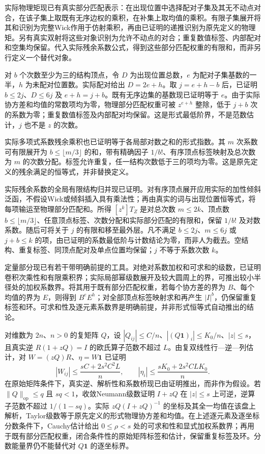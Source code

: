 \documentclass[UTF8,11pt,fontset=fandol]{ctexart}
\begin{document}
实际物理矩现已有真实部分匹配表示：在出现位置中选择配对子集及其无不动点对合，在该子集上取既有无序边权的乘积，在补集上取均值的乘积。有限子集展开将其和识别为完整Wick作用于仿射乘积，再由已证明的递推识别为原先定义的物理矩。另有真实双射将这些对象识别为允许不动点的对合；重复数值标签、内部配对和空集均保留。代入实际残余系数公式，得到这些部分匹配权重的有限和，而非另行定义一个替代对象。

对 $b$ 个次数至少为三的结构顶点，令 $D$ 为出现位置总数，$e$ 为配对子集基数的一半，$h$ 为未配对位置数。实际配对给出 $D=2e+h$。取 $j=e+h-b$ 后，已证明 $b\le2j$、$D\le6j$ 及 $e+h=j+b$。既有无序边集的基数现已证明等于 $e$。由于实际协方差和均值的常数项均为零，物理部分匹配权重可被 $z^{e+h}$ 整除，低于 $j+b$ 次的系数为零；重复数值标签及内部配对均保留。这是形式最低阶界，不是范数估计，$j$ 也不是 $z$ 的次数。

实际多项式系数残余乘积也已证明等于各局部对数之和的形式指数。其 $m$ 次系数可有限展开为 $b\le\lfloor m/3\rfloor$ 的和，带有精确因子 $1/b!$、有序顶点标签映射及总次数为 $m$ 的次数分配。标签允许重复，任一结构次数低于三的项均为零。这是原先定义的残余满足的恒等式，并非替换定义。

实际残余系数的全局有限结构归并现已证明。对有序顶点展开应用实际的加性倾斜泛函，不假设Wick或倾斜插入具有乘法性；再由真实的词与出现位置恒等式，将每项输运至物理部分匹配和。所得 $[z^k]T_Z$ 是对总次数 $m\le2k$、顶点数 $b\le\lfloor m/3\rfloor$、任意顶点标签、次数分配和实际部分匹配的有限和，保留 $1/b!$ 及对数系数。随后可将关于 $j$ 的有限和移至最外层。凡不满足 $b\le2j$、$m\le6j$ 或 $j+b\le k$ 的项，由已证明的系数最低阶与计数结论为零，而非人为截去。空结构、重复标签、同顶点配对及单点位置均保留；$j$ 不等于系数次数 $k$。

定量部分现已有若干带明确前提的工具。对绝对系数加权和可求和的级数，已证明卷积次乘性和有限乘积界；实际局部幂级数展开及较大圆周上的界，可推出较小半径处的加权系数界。将其用于既有部分匹配权重，若每个协方差的界为 $B$、每个均值的界为 $E$，则得到 $B^eE^h$；对全部顶点标签映射求和再产生 $|I|^b$，仍保留重复标签和环。可求和性及逐元素系数界是明确前提，并非形式恒等式自动推出的结论。

对维数为 $2n$、$n>0$ 的复矩阵 $Q$，设 $|Q_{ij}|\le C/n$、$|(Q\mathbf1)_i|\le K_0/n$、$|z|\le s$，且真实逆 $R(1+zQ)=I$ 的欧氏算子范数不超过 $L$。由复双线性行—逆—列估计，对 $W=(zQ)R$、$\eta=W\mathbf1$ 已证明
\[
 |W_{ij}|\le\frac{sC+2s^2C^2L}{n},\qquad
 |\eta_i|\le\frac{sK_0+2s^2CLK_0}{n}.
\]
在原始矩阵条件下，真实逆、解析性和系数桥现已由证明推出，而非作为假设。若 $\|Q\|_{\mathrm{op}}\le q$ 且 $sq<1$，收敛Neumann级数证明 $I+zQ$ 在 $|z|\le s$ 上可逆，逆算子范数不超过 $1/(1-sq)$。实际 $zQ(I+zQ)^{-1}$ 的坐标及其全一均值在该盘上解析，Taylor级数等于原先定义的形式物理协方差和均值。在上述逐元素及逐坐标分数条件下，Cauchy估计给出 $0\le\rho<s$ 处的可求和性和显式加权系数界；再用于既有部分匹配权重，闭合条件性的原始矩阵标签和估计，保留重复标签及环。分数能量界仍不能替代对 $Q\mathbf1$ 的逐坐标界。
\end{document}
